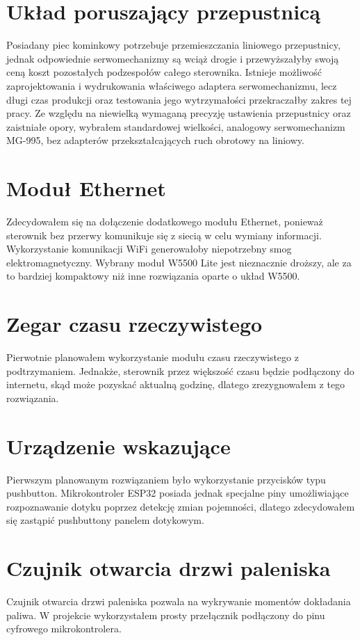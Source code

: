 \documentclass[11pt]{report}
\begin{document}
 \section{Układ poruszający przepustnicą} 
 Posiadany piec kominkowy potrzebuje przemieszczania liniowego przepustnicy, jednak odpowiednie serwomechanizmy są wciąż drogie i przewyższałyby swoją ceną koszt pozostałych podzespołów całego sterownika.
 Istnieje możliwość zaprojektowania i wydrukowania właściwego adaptera serwomechanizmu, lecz długi czas produkcji oraz testowania jego wytrzymałości przekraczałby zakres tej pracy.
  Ze względu na niewielką wymaganą precyzję ustawienia przepustnicy oraz zaistniałe opory, wybrałem standardowej wielkości, analogowy serwomechanizm MG-995, bez adapterów przekształcających ruch obrotowy na liniowy.
 
 \section{Moduł Ethernet}
 Zdecydowałem się na dołączenie dodatkowego modułu Ethernet, ponieważ sterownik bez przerwy komunikuje się z siecią w celu wymiany informacji. Wykorzystanie komunikacji WiFi generowałoby niepotrzebny smog elektromagnetyczny. Wybrany moduł W5500 Lite jest nieznacznie droższy, ale za to bardziej kompaktowy niż inne rozwiązania oparte o układ W5500.
 
 \section{Zegar czasu rzeczywistego}
 Pierwotnie planowałem wykorzystanie modułu czasu rzeczywistego z podtrzymaniem. Jednakże, sterownik przez większość czasu będzie podłączony do internetu, skąd może pozyskać aktualną godzinę, dlatego zrezygnowałem z tego rozwiązania.
 
 \section{Urządzenie wskazujące}
 Pierwszym planowanym rozwiązaniem było wykorzystanie przycisków typu pushbutton. Mikrokontroler ESP32 posiada jednak specjalne piny umożliwiające rozpoznawanie dotyku poprzez detekcję zmian pojemności, dlatego zdecydowałem się zastąpić pushbuttony panelem dotykowym.
 
 \section{Czujnik otwarcia drzwi paleniska}
 Czujnik otwarcia drzwi paleniska pozwala na wykrywanie momentów dokładania paliwa. W projekcie wykorzystałem prosty przełącznik podłączony do pinu cyfrowego mikrokontrolera.
 
\end{document}

